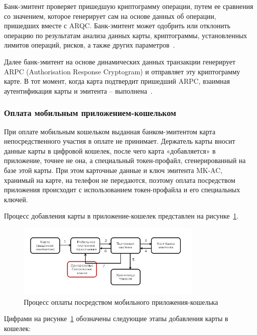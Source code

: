 Банк-эмитент проверяет пришедшую криптограмму операции, путем ее сравнения со значением, которое генерирует сам на основе данных об операции, пришедших вместе с ARQC.
Банк-эмитент может одобрить или отклонить операцию по результатам анализа данных карты, криптограммы, установленных лимитов операций, рисков, а также других параметров~\cite{habr_nspk_mir_payment}.

Далее банк-эмитент на основе динамических данных транзакции генерирует ARPC (Authorisation Response Cryptogram) и отправляет эту криптограмму карте.
В тот момент, когда карта подтвердит пришедший ARPC, взаимная аутентификация карты и эмитента – выполнена~\cite{emv_card_mechanism}.


\subsubsection{Оплата мобильным приложением-кошельком}

При оплате мобильным кошельком выданная банком-эмитентом карта непосредственного участия в оплате не принимает.
Держатель карты вносит данные карты в цифровой кошелек, после чего карта «добавляется» в приложение, точнее не она, а специальный токен-профайл, сгенерированный на базе этой карты.
При этом карточные данные и ключ эмитента MK-AC, хранимый на карте, на телефон не передаются, поэтому оплата посредством приложения происходит с использованием токен-профайла и его специальных ключей.

Процесс добавления карты в приложение-кошелек представлен на рисунке~\ref{fig:add_mob_cardholder}.

\begin{figure}[H]
    \centering
    \includegraphics[width=0.8\textwidth]{images/research/add_mob_cardholder}
    \caption{\centering Процесс оплаты посредством мобильного приложения-кошелька}
    \label{fig:add_mob_cardholder}
\end{figure}

Цифрами на рисунке~\ref{fig:add_mob_cardholder} обозначены следующие этапы добавления карты в кошелек:

